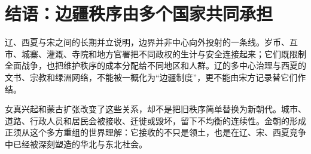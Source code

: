 \section{结语：边疆秩序由多个国家共同承担}

辽、西夏与宋之间的长期并立说明，边界并非中心向外投射的一条线。岁币、互市、城寨、灌溉、寺院和地方官署把不同政权的生计与安全连接起来；它们既限制全面战争，也把维护秩序的成本分配给不同地区和人群。辽的多中心治理与西夏的文书、宗教和绿洲网络，不能被一概化为“边疆制度”，更不能由宋方记录替它们作结。

女真兴起和蒙古扩张改变了这些关系，却不是把旧秩序简单替换为新朝代。城市、道路、行政人员和居民会被接收、迁徙或毁坏，留下不均衡的连续性。金朝的形成正须从这个多方重组的世界理解：它接收的不只是领土，也是在辽、宋、西夏竞争中已经被深刻塑造的华北与东北社会。
